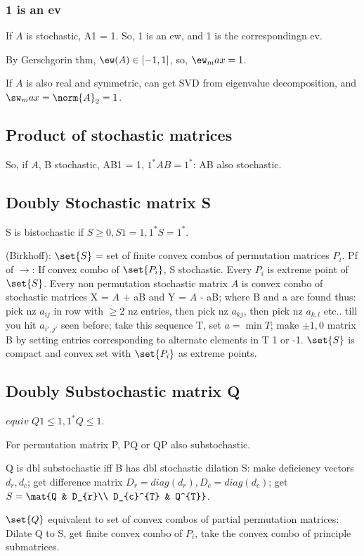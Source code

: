 \documentclass[oneside, article]{memoir}
\begin{document}
\subsubsection{1 is an ev}
If $A$ is stochastic, A1 = 1. So, 1 is an ew, and 1 is the correspondingn ev.

By Gerschgorin thm, $\ew(A) \in [-1, 1]$, so, $\ew_max = 1$.

If $A$ is also real and symmetric, can get SVD from eigenvalue decomposition, and $\sw_max = \norm{A}_2 = 1$.

\subsection{Product of stochastic matrices}
So, if $A$, B stochastic, AB1 = 1, $1^{*}AB = 1^{*}$: AB also stochastic.

\subsection{Doubly Stochastic matrix S}
S is bistochastic if $S \geq 0, S1 = 1, 1^{*}S = 1^{*}$.

(Birkhoff): $\set{S}$ = set of finite convex combos of permutation matrices $P_{i}$. Pf of $\to$: If convex combo of $\set{P_{i}}$, S stochastic. Every $P_{i}$ is extreme point of $\set{S}$. Every non permutation stochastic matrix $A$ is convex combo of stochastic matrices X = $A$ + aB and Y = $A$ - aB; where B and a are found thus: pick nz $a_{ij}$ in row with $\geq 2$ nz entries, then pick nz $a_{kj}$, then pick nz $a_{k,l}$ etc.. till you hit $a_{i',j'}$ seen before; take this sequence T, set $a = \min T$; make $\pm 1, 0$ matrix B by setting entries corresponding to alternate elements in T 1 or -1. $\set{S}$ is compact and convex set with $\set{P_{i}}$ as extreme points.

\subsection{Doubly Substochastic matrix Q}
$equiv$ $Q1 \leq 1, 1^{*}Q \leq 1$.

For permutation matrix P, PQ or QP also substochastic.

Q is dbl substochastic iff B has dbl stochastic dilation S: make deficiency vectors $d_{r}, d_{c}$; get difference matrix $D_{r}  = diag(d_{r}), D_{c}  = diag(d_{c})$; get $S = \mat{Q & D_{r}\\ D_{c}^{T} & Q^{T}}$.

$\set{Q}$ equivalent to set of convex combos of partial permutation matrices: Dilate Q to S, get finite convex combo of $P_{i}$, take the convex combo of principle submatrices.
\end{document}
